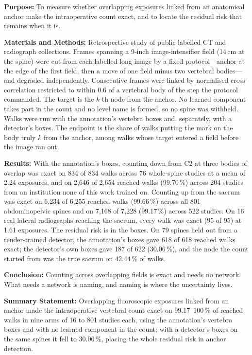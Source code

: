 \documentclass[11pt,letterpaper]{article}
\begin{document}
\noindent\textbf{Purpose:} To measure whether overlapping exposures linked from an anatomical anchor make
the intraoperative count exact, and to locate the residual risk that remains when it is.

\noindent\textbf{Materials and Methods:} Retrospective study of public labelled CT and radiograph
collections. Frames spanning a 9-inch image-intensifier field (14\,cm at the spine) were cut from each
labelled long image by a fixed protocol---anchor at the edge of the first field, then a move of one field
minus two vertebral bodies---and degraded independently. Consecutive frames were linked by normalised
cross-correlation restricted to within 0.6 of a vertebral body of the step the protocol commanded. The
target is the $k$-th node from the anchor. No learned component takes part in the count and no level name
is formed, so no spine was withheld. Walks were run with the annotation's vertebra boxes and, separately,
with a detector's boxes. The endpoint is the share of walks putting the mark on the body truly $k$ from the
anchor, among walks whose target entered a field before the image ran out.

\noindent\textbf{Results:} With the annotation's boxes, counting down from C2 at three bodies of overlap
was exact on 834 of 834 walks across 76 whole-spine studies at a mean of 2.24 exposures, and on 2,646 of
2,654 reached walks (99.70\,\%) across 204 studies from an institution none of this work trained on.
Counting up from the sacrum was exact on 6,234 of 6,255 reached walks (99.66\,\%) across all 801
abdominopelvic spines and on 7,168 of 7,228 (99.17\,\%) across 522 studies. On 16 real lateral radiographs
reaching the sacrum, every walk was exact (95 of 95) at 1.61 exposures. The residual risk is in the boxes.
On 79 spines held out from a render-trained detector, the annotation's boxes gave 618 of 618 reached walks
exact; the detector's own boxes gave 187 of 622 (30.06\,\%), and the node the count started from was the
true sacrum on 42.44\,\% of walks.

\noindent\textbf{Conclusion:} Counting across overlapping fields is exact and needs no network. What needs
a network is naming, and naming is where the uncertainty lives.

\medskip
\noindent\textbf{Summary Statement:} Overlapping fluoroscopic exposures linked from an anchor made the
intraoperative vertebral count exact on 99.17--100\,\% of reached walks in nine arms of 16 to 801 studies
each, using the annotation's vertebra boxes and with no learned component in the count; with a detector's
boxes on the same spines it fell to 30.06\,\%, placing the whole residual risk in anchor detection.
\end{document}
